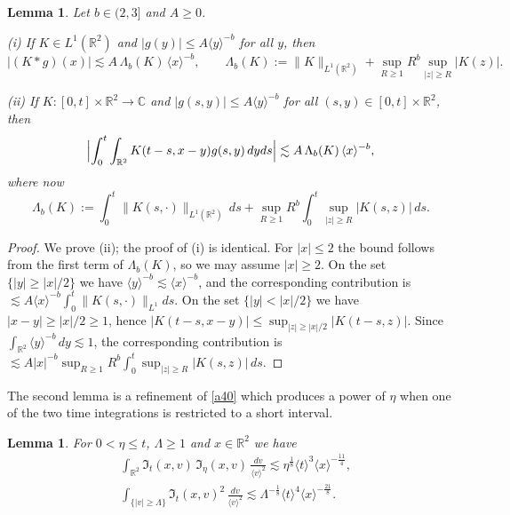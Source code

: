 \documentclass[reqno,11pt]{amsart}
\numberwithin{equation}{section}
\def\C{{\mathbb{C}}}
\def\R{{\mathbb R}}
\def\R{{\bf R}}
\def\R{\mathbb{R}}
\newtheorem{lemma}[theorem]{Lemma}
\begin{document}
	\begin{lemma}\label{convLe}
		Let $b\in(2,3]$ and $A\geq0$.

		(i) If $K\in L^1(\R^2)$ and $|g(y)|\leq A\langle y\rangle^{-b}$ for all $y$, then
		\begin{equation*}
			|(K\ast g)(x)|\lesssim A\,\Lambda_b(K)\,\langle x\rangle^{-b},
			\qquad
			\Lambda_b(K):=\|K\|_{L^1(\R^2)}+\sup_{R\geq1}R^{b}\sup_{|z|\geq R}|K(z)| .
		\end{equation*}

		(ii) If $K:[0,t]\times\R^2\to\C$ and $|g(s,y)|\leq A\langle y\rangle^{-b}$ for all
		$(s,y)\in[0,t]\times\R^2$, then
		\begin{equation*}
			\Bigl|\int_0^t \int_{\R^2} K(t-s,x-y) g(s,y)\,dyds\Bigr|
			\lesssim A\,\Lambda_b(K)\,\langle x\rangle^{-b},
		\end{equation*}
		where now
		\[
			\Lambda_b(K):=\int_0^t\|K(s,\cdot)\|_{L^1(\R^2)}\,ds
			+\sup_{R\geq1}R^{b}\int_0^t\sup_{|z|\geq R}|K(s,z)|\,ds.
		\]
	\end{lemma}

	\begin{proof} We prove (ii); the proof of (i) is identical. For $|x|\leq2$ the bound follows from
	the first term of $\Lambda_b(K)$, so we may assume $|x|\geq2$. On the set $\{|y|\geq|x|/2\}$ we
	have $\langle y\rangle^{-b}\lesssim\langle x\rangle^{-b}$, and the corresponding contribution is
	$\lesssim A\langle x\rangle^{-b}\int_0^t\|K(s,\cdot)\|_{L^1}ds$. On the set $\{|y|<|x|/2\}$ we have
	$|x-y|\geq|x|/2\geq1$, hence $|K(t-s,x-y)|\leq\sup_{|z|\geq|x|/2}|K(t-s,z)|$. Since
	$\int_{\R^2}\langle y\rangle^{-b}\,dy\lesssim1$, the corresponding contribution is
	$\lesssim A|x|^{-b}\sup_{R\geq1}R^b\int_0^t\sup_{|z|\geq R}|K(s,z)|\,ds$.
	\end{proof}

	The second lemma is a refinement of \eqref{a40} which produces a power of $\eta$ when one of the two
	time integrations is restricted to a short interval.

	\begin{lemma}\label{intLe} For $0<\eta\leq t$, $\Lambda\geq1$ and $x\in\R^2$ we have
		\begin{align}
			&\int_{\R^2}\mathfrak I_t(x,v)\,\mathfrak I_{\eta}(x,v)\,\frac{dv}{\langle v\rangle^2}
			\lesssim\eta^{\frac18}\langle t\rangle^{3}\langle x\rangle^{-\frac{11}{4}},
			\label{s7c7}\\
			&\int_{\{|v|\geq\Lambda\}}\mathfrak I_t(x,v)^2\,\frac{dv}{\langle v\rangle^2}
			\lesssim\Lambda^{-\frac18}\langle t\rangle^{4}\langle x\rangle^{-\frac{21}{8}} .
			\label{s7c8}
		\end{align}
	\end{lemma}
\end{document}
